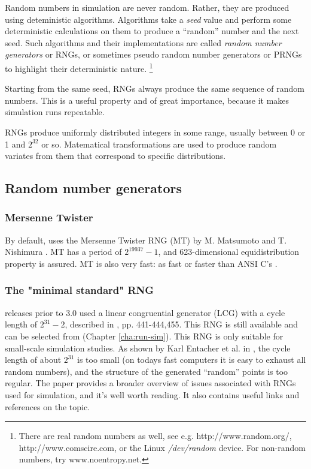 Random numbers in simulation are never random. Rather, they are
produced using deteministic algorithms. Algorithms take a \textit{seed} value
and perform some deterministic calculations on them to produce
a ``random'' number and the next seed. Such algorithms and their
implementations are called \textit{random number generators} or RNGs,
or sometimes pseudo random number generators or PRNGs to highlight
their deterministic nature.
  \footnote{There are real random numbers as well, see e.g.
  http://www.random.org/, http://www.comscire.com, or the Linux
  \textit{/dev/random} device. For non-random numbers, try www.noentropy.net.}

Starting from the same seed, RNGs always produce the same sequence
of random numbers. This is a useful property and of great importance,
because it makes simulation runs repeatable.

RNGs produce uniformly distributed integers in some range,
usually between 0 or 1 and $2^{32}$ or so. Matematical transformations
are used to produce random variates from them that correspond to
specific distributions.

\subsection{Random number generators}

\subsubsection{Mersenne Twister}

By default, {\opp} uses the Mersenne Twister RNG (MT) by M. Matsumoto and
T. Nishimura \cite{Matsumoto98}. MT has a period of $2^19937-1$,
and 623-dimensional equidistribution property is assured. MT is
also very fast: as fast or faster than ANSI C's .

\subsubsection{The "minimal standard" RNG}

{\opp} releases prior to 3.0 used a linear congruential generator
(LCG) with a cycle length of $2^{31}-2$, described in
\cite{Jain91}, pp. 441-444,455. This RNG is still available
and can be selected from  (Chapter \ref{cha:run-sim}).
This RNG is only suitable for small-scale simulation studies.
As shown by Karl Entacher et al. in \cite{Entacher02},
the cycle length of about $2^{31}$ is too small (on todays
fast computers it is easy to exhaust all random numbers), and
the structure of the generated ``random'' points is too regular.
The \cite{Hellekalek98} paper provides a broader overview of issues
associated with RNGs used for simulation, and it's well worth reading.
It also contains useful links and references on the topic.

